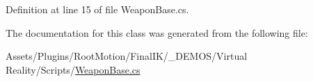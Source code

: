 Definition at line 15 of file Weapon\+Base.\+cs.



The documentation for this class was generated from the following file\+:\begin{DoxyCompactItemize}
\item 
Assets/\+Plugins/\+Root\+Motion/\+Final\+I\+K/\+\_\+\+D\+E\+M\+O\+S/\+Virtual Reality/\+Scripts/\mbox{\hyperlink{_weapon_base_8cs}{Weapon\+Base.\+cs}}\end{DoxyCompactItemize}
